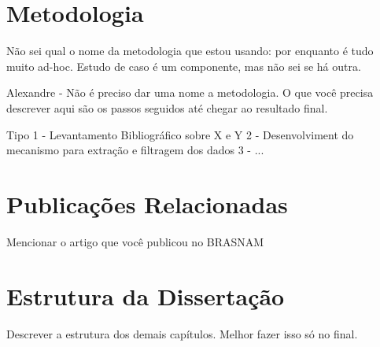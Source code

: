 \section{Metodologia}

Não sei qual o nome da metodologia que estou usando: por enquanto é tudo muito ad-hoc. Estudo de caso é um componente, mas não sei se há outra.

Alexandre -  Não é preciso dar uma nome a metodologia. O que você precisa descrever aqui são os passos seguidos até chegar ao resultado final.

Tipo
1 - Levantamento Bibliográfico sobre X e Y
2 - Desenvolviment do mecanismo para extração e filtragem dos dados
3 - ...

\section{Publicações Relacionadas}

Mencionar o artigo que você publicou no BRASNAM

\section{Estrutura da Dissertação}

Descrever a estrutura dos demais capítulos. Melhor fazer isso só no final.